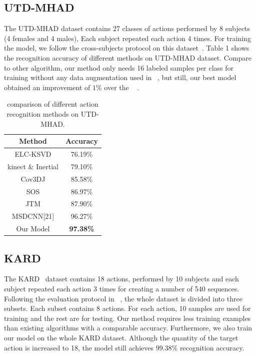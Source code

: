 \documentclass{bmvc2k}
\begin{document}
\subsection*{UTD-MHAD}
The UTD-MHAD dataset contains 27 classes of actions performed by 8 subjects (4 females and 4 males), Each subject repeated each action 4 times. For training the model, we follow the cross-subjects protocol on this dataset~\cite{chen2015utd}. Table 1 shows the recognition accuracy of different methods on UTD-MHAD dataset. Compare to other algorithm, our method only needs 16 labeled samples per class for training without any data augmentation used in ~\cite{pham2017learning,li2017skeleton_2}, but still, our best model obtained an improvement of $1\%$ over the ~\cite{li2017skeleton_2} .

\begin{table}[htb]
	\begin{center}		
		\begin{tabular}{|c|c|}
			\hline
			Method & Accuracy \\
			\hline\hline
			ELC-KSVD & 76.19\% \\
			kinect \& Inertial & 79.10\% \\
			Cov3DJ & 85.58\%\\
			SOS & 86.97\% \\
			JTM & 87.90\% \\
			MSDCNN[21] & 96.27\% \\
			Our Model & \bf{97.38\%} \\
			\hline
		\end{tabular}	
	\end{center}		
	\caption{ comparison of different action recognition methods on UTD-MHAD.}
	\label{tab:1}
\end{table}

\subsection*{KARD}
The KARD~\cite{gaglio2015human} dataset contains 18 actions, performed by 10 subjects and each subject repeated each action 3 times for creating a number of 540 sequences. Following the evaluation protocol in ~\cite{pham2017learning}, the whole dataset is divided into three subsets. Each subset contains 8 actions. For each action, 10 samples are used for training and the rest are for testing. Our method requires less training examples than existing algorithms with a comparable accuracy. Furthermore, we also train our model on the whole KARD dataset. Although the quantity of the target action is increased to 18, the model still achieves $99.38\%$ recognition accuracy.
\end{document}
